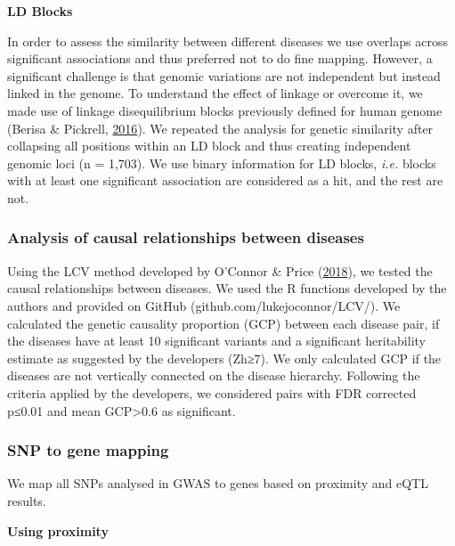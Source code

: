 \documentclass[12pt,twoside]{unicam}
\begin{document}
\textbf{LD Blocks}

In order to assess the similarity between different diseases we use overlaps across significant associations and thus preferred not to do fine mapping. However, a significant challenge is that genomic variations are not independent but instead linked in the genome. To understand the effect of linkage or overcome it, we made use of linkage disequilibrium blocks previously defined for human genome (Berisa \& Pickrell, \protect\hyperlink{ref-Berisa2016}{2016}). We repeated the analysis for genetic similarity after collapsing all positions within an LD block and thus creating independent genomic loci (n = 1,703). We use binary information for LD blocks, \emph{i.e.} blocks with at least one significant association are considered as a hit, and the rest are not.

\hypertarget{analysis-of-causal-relationships-between-diseases}{%
\subsubsection{Analysis of causal relationships between diseases}\label{analysis-of-causal-relationships-between-diseases}}

Using the LCV method developed by O'Connor \& Price (\protect\hyperlink{ref-OConnor2018}{2018}), we tested the causal relationships between diseases. We used the R functions developed by the authors and provided on GitHub (github.com/lukejoconnor/LCV/). We calculated the genetic causality proportion (GCP) between each disease pair, if the diseases have at least 10 significant variants and a significant heritability estimate as suggested by the developers (Zh≥7). We only calculated GCP if the diseases are not vertically connected on the disease hierarchy. Following the criteria applied by the developers, we considered pairs with FDR corrected p≤0.01 and mean GCP\textgreater0.6 as significant.

\hypertarget{snp-to-gene-mapping}{%
\subsubsection{SNP to gene mapping}\label{snp-to-gene-mapping}}

We map all SNPs analysed in GWAS to genes based on proximity and eQTL results.

\textbf{Using proximity}
\end{document}
